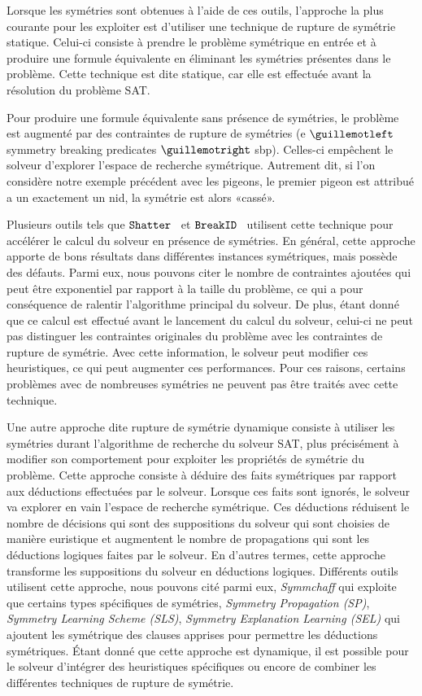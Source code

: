 Lorsque les symétries sont obtenues à l'aide de ces outils, l'approche la plus courante pour les exploiter est d'utiliser une technique de rupture de symétrie statique. Celui-ci consiste à prendre le problème symétrique en entrée et à produire une formule équivalente en éliminant les symétries présentes dans le problème.
Cette technique est dite statique, car elle est effectuée avant la résolution du problème SAT. 

Pour produire une formule équivalente sans présence de symétries, le problème est augmenté par des 
contraintes de rupture de  symétries (e $\guillemotleft$symmetry breaking predicates $\guillemotright$ sbp). Celles-ci empêchent le solveur d'explorer l'espace de recherche symétrique. 
Autrement dit, si l'on considère notre exemple précédent avec les pigeons, le premier pigeon est attribué a un
exactement un nid, la symétrie est alors «cassé».

Plusieurs outils tels que $\texttt{Shatter}$~\cite{} et $\texttt{BreakID}$~\cite{} utilisent cette technique pour accélérer le calcul du solveur en présence de symétries.
En général, cette approche apporte de bons résultats dans différentes instances symétriques, mais possède des défauts. Parmi eux, nous pouvons citer le nombre de contraintes ajoutées qui peut être exponentiel par rapport à la taille du problème, ce qui a pour conséquence de ralentir l'algorithme principal du solveur.
De plus, étant donné que ce calcul est effectué avant le lancement du calcul du solveur, celui-ci ne peut pas distinguer les contraintes originales du problème avec les contraintes de rupture de symétrie. Avec cette information, le solveur peut modifier ces heuristiques, ce qui peut augmenter ces performances.
Pour ces raisons, certains problèmes avec de nombreuses symétries ne peuvent pas être traités avec cette technique.

Une autre approche dite rupture de symétrie dynamique consiste à utiliser les symétries durant l'algorithme de recherche du solveur SAT, plus précisément à modifier son comportement pour exploiter les propriétés de symétrie du problème. Cette approche consiste à déduire des faits symétriques par rapport aux déductions effectuées par le solveur. Lorsque ces faits sont ignorés, le solveur va explorer en vain l'espace de recherche symétrique.
Ces déductions réduisent le nombre de décisions qui sont des suppositions du solveur qui sont choisies de 
manière euristique et augmentent le nombre de propagations qui sont les déductions logiques faites par le solveur. En d'autres termes, cette approche transforme les suppositions du solveur en déductions logiques.
Différents outils utilisent cette approche, nous pouvons cité parmi eux, \textit{Symmchaff}
qui exploite que certains types spécifiques de symétries, \textit{Symmetry Propagation (SP)}, \textit{Symmetry Learning Scheme (SLS)}, \textit{Symmetry Explanation Learning (SEL)} qui ajoutent les symétrique des
clauses apprises pour permettre les déductions symétriques.
Étant donné que cette approche est dynamique, il est possible pour le solveur 
d'intégrer des heuristiques spécifiques ou encore de combiner les différentes techniques de rupture de symétrie.


